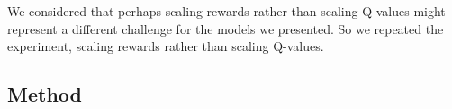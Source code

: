 
We considered that perhaps scaling rewards rather than scaling Q-values might represent a different challenge for the models we presented. So we repeated the experiment, scaling rewards rather than scaling Q-values.

\subsection{Method}
